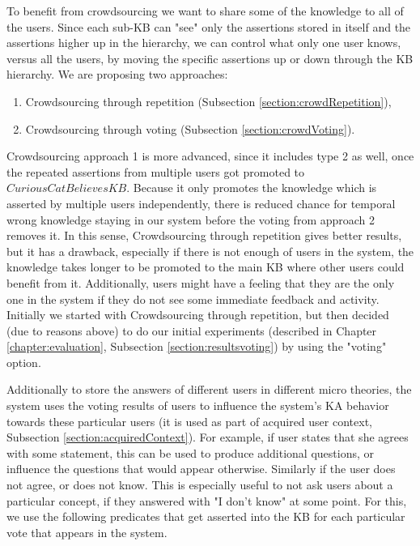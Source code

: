 To benefit from crowdsourcing we want to share some of the knowledge to all of 
the users. Since each sub-KB can "see" only the assertions stored in itself and 
the assertions higher up in the hierarchy, we can control what only one user 
knows, versus all the users, by moving the specific assertions up or down 
through the KB hierarchy. 
We are proposing two approaches: 
\begin{enumerate}
\item Crowdsourcing through repetition (Subsection \ref{section:crowdRepetition}),
\item Crowdsourcing through voting (Subsection \ref{section:crowdVoting}).
\end{enumerate}
Crowdsourcing approach 1 is more advanced, since it includes type 2 as well, 
once the 
repeated assertions from multiple users got promoted to $CuriousCatBelievesKB$. 
Because it only promotes the knowledge which is asserted by multiple users 
independently, there is reduced chance for temporal wrong knowledge staying in 
our system before the voting from approach 2 removes it. In this sense, 
Crowdsourcing through repetition gives better results, but it has a drawback, 
especially if there is not enough of users in the system, the knowledge takes 
longer to be promoted to the main KB where other users could benefit from it. 
Additionally, users might have a feeling that they are the only one in the 
system if they do not see some immediate feedback and activity. 
Initially we started with Crowdsourcing through repetition, but then 
decided (due to reasons above) to do our initial experiments 
(described in Chapter \ref{chapter:evaluation}, Subsection \ref{section:resultsvoting}) 
by using the "voting" option.

Additionally to store the answers of different users in different micro theories,
the system uses the voting results of users to influence the system's KA 
behavior towards these particular users (it is used as part of acquired user 
context, Subsection \ref{section:acquiredContext}). For example, if user states that 
she agrees with some statement,
this can be used to produce additional questions, or influence the questions
that would appear otherwise. Similarly if the user does not agree, or does not
know. This is especially useful to not ask users about a  particular concept, if
they answered with "I don't know" at some point. For this, we use the following
predicates that get asserted into the KB for each particular vote that appears
in the system.

